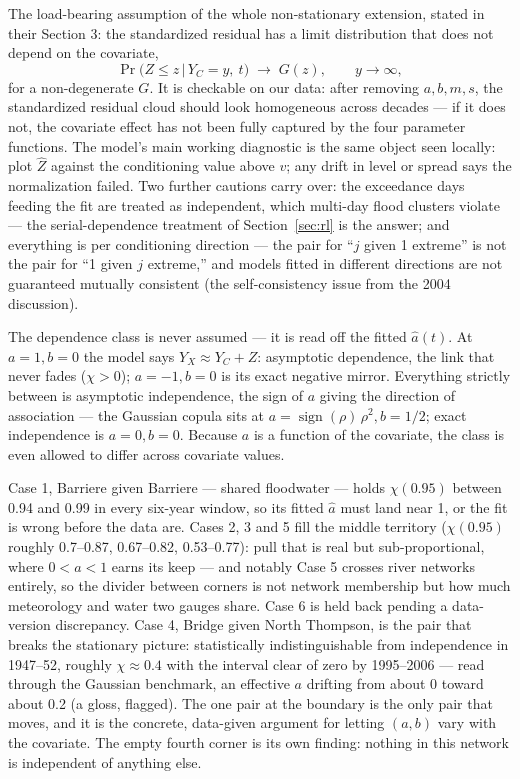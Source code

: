 \documentclass[11pt]{article}
\begin{document}
The load-bearing assumption of the whole non-stationary extension, stated in their Section 3: the standardized residual has a limit distribution that does not depend on the covariate,
\[
\Pr\bigl(Z \le z \,\big|\, Y_C = y,\ t\bigr) \;\to\; G(z), \qquad y \to \infty,
\]
for a non-degenerate $G$. It is checkable on our data: after removing $a, b, m, s$, the standardized residual cloud should look homogeneous across decades --- if it does not, the covariate effect has not been fully captured by the four parameter functions. The model's main working diagnostic is the same object seen locally: plot $\hat Z$ against the conditioning value above $v$; any drift in level or spread says the normalization failed. Two further cautions carry over: the exceedance days feeding the fit are treated as independent, which multi-day flood clusters violate --- the serial-dependence treatment of Section~\ref{sec:rl} is the answer; and everything is per conditioning direction --- the pair for ``$j$ given 1 extreme'' is not the pair for ``1 given $j$ extreme,'' and models fitted in different directions are not guaranteed mutually consistent (the self-consistency issue from the 2004 discussion).

The dependence class is never assumed --- it is read off the fitted $\hat a(t)$. At $a = 1, b = 0$ the model says $Y_X \approx Y_C + Z$: asymptotic dependence, the link that never fades ($\chi > 0$){\color{green}; $a = -1, b = 0$ is its exact negative mirror}. Everything {\color{green}strictly between is asymptotic independence, the sign of $a$ giving the direction of association --- the Gaussian copula sits at $a = \operatorname{sign}(\rho)\, \rho^2, b = 1/2$}; exact independence is $a = 0, b = 0$. Because $a$ is a function of the covariate, the class is even allowed to differ across covariate values.

Case 1, Barriere given Barriere --- shared floodwater --- holds $\chi(0.95)$ between 0.94 and 0.99 in every six-year window, so its fitted $\hat a$ must land near 1, or the fit is wrong before the data are. Cases 2, 3 and 5 fill the middle territory ($\chi(0.95)$ roughly 0.7--0.87, 0.67--0.82, 0.53--0.77): pull that is real but sub-proportional, where $0 < a < 1$ earns its keep --- and notably Case 5 crosses river networks entirely, so the divider between corners is not network membership but how much meteorology and water two gauges share. Case 6 is held back pending a data-version discrepancy. Case 4, Bridge given North Thompson, is the pair that breaks the stationary picture: statistically indistinguishable from independence in 1947--52, roughly $\chi \approx 0.4$ with the interval clear of zero by 1995--2006 --- read through the Gaussian benchmark, an effective $a$ drifting from about 0 toward about 0.2 (a gloss, flagged). The one pair at the boundary is the only pair that moves, and it is the concrete, data-given argument for letting $(a, b)$ vary with the covariate. The empty fourth corner is its own finding: nothing in this network is independent of anything else.
\end{document}

